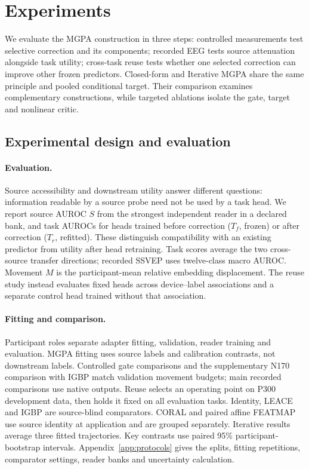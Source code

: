 \section{Experiments}
\label{sec:experiments}
We evaluate the MGPA construction in three steps: controlled measurements
test selective correction and its components; recorded EEG tests source
attenuation alongside task utility; cross-task reuse tests whether one
selected correction can improve other frozen predictors. Closed-form and
Iterative MGPA share the same principle and pooled conditional target.
Their comparison examines complementary constructions, while targeted
ablations isolate the gate, target and nonlinear critic.

\subsection{Experimental design and evaluation}
\label{sec:protocol}
\paragraph{Evaluation.}
Source accessibility and downstream utility answer different questions:
information readable by a source probe need not be used by a task head.
We report source AUROC $S$ from the strongest independent reader in a
declared bank, and task AUROCs for heads trained before correction
($T_f$, frozen) or after correction ($T_r$, refitted).
These distinguish compatibility with an existing predictor from utility
after head retraining. Task scores average the two cross-source transfer
directions; recorded SSVEP uses twelve-class macro AUROC.
Movement $M$ is the participant-mean relative embedding displacement.
The reuse study instead evaluates fixed heads across device--label
associations and a separate control head trained without that association.

\paragraph{Fitting and comparison.}
Participant roles separate adapter fitting, validation, reader training
and evaluation. MGPA fitting uses source labels and calibration
contrasts, not downstream labels. Controlled gate comparisons and the
supplementary N170 comparison with IGBP match validation movement budgets;
main recorded comparisons use native outputs. Reuse selects an operating point on
P300 development data, then holds it fixed on all evaluation tasks.
Identity, LEACE and IGBP are source-blind comparators. CORAL and paired affine
FEATMAP use source identity at application and are grouped separately.
Iterative results average three fitted trajectories. Key contrasts use
paired 95\% participant-bootstrap intervals. Appendix~\ref{app:protocols}
gives the splits, fitting repetitions, comparator settings, reader banks
and uncertainty calculation.

